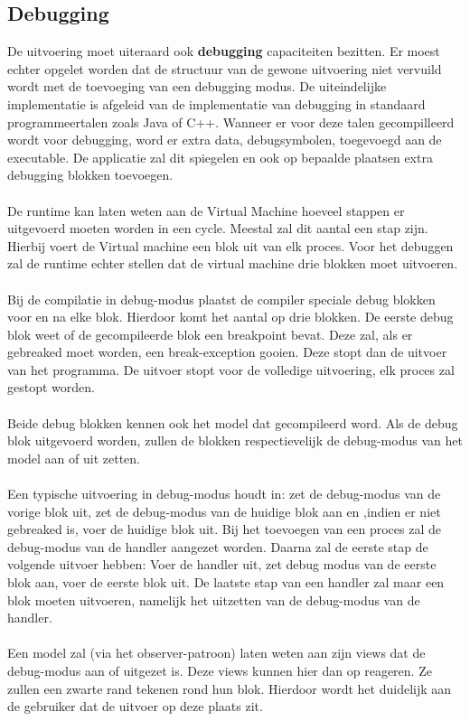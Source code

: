 \documentclass[]{article}
\begin{document}
\subsection{Debugging}
\label{debugging}
De uitvoering moet uiteraard ook \textbf{debugging} capaciteiten bezitten. Er moest echter opgelet worden dat de structuur van de gewone uitvoering niet vervuild wordt met de toevoeging van een debugging modus. De uiteindelijke implementatie is afgeleid van de implementatie van debugging in standaard programmeertalen zoals Java of C++. Wanneer er voor deze talen gecompilleerd wordt voor debugging, word er extra data, debugsymbolen, toegevoegd aan de executable. De applicatie zal dit spiegelen en ook op bepaalde plaatsen extra debugging blokken toevoegen. \\\\
De runtime kan laten weten aan de Virtual Machine hoeveel stappen er uitgevoerd moeten worden in een cycle. Meestal zal dit aantal een stap zijn. Hierbij voert de Virtual machine een blok uit van elk proces. Voor het debuggen zal de runtime echter stellen dat de virtual machine drie blokken moet uitvoeren. \\\\
Bij de compilatie in debug-modus plaatst de compiler speciale debug blokken voor en na elke blok. Hierdoor komt het aantal op drie blokken. De eerste debug blok weet of de gecompileerde blok een breakpoint bevat. Deze zal, als er gebreaked moet worden, een break-exception gooien. Deze stopt dan de uitvoer van het programma. De uitvoer stopt voor de volledige uitvoering, elk proces zal gestopt worden. \\\\
Beide debug blokken kennen ook het model dat gecompileerd word. Als de debug blok uitgevoerd worden, zullen de blokken respectievelijk de debug-modus van het model aan of uit zetten. \\\\
Een typische uitvoering in debug-modus houdt in: zet de debug-modus van de vorige blok uit, zet de debug-modus van de huidige blok aan en ,indien er niet gebreaked is, voer de huidige blok uit. Bij het toevoegen van een proces zal de debug-modus van de handler aangezet worden. Daarna zal de eerste stap de volgende uitvoer hebben: Voer de handler uit, zet debug modus van de eerste blok aan, voer de eerste blok uit. De laatste stap van een handler zal maar een blok moeten uitvoeren, namelijk het uitzetten van de debug-modus van de handler. \\\\
Een model zal (via het observer-patroon) laten weten aan zijn views dat de debug-modus aan of uitgezet is. Deze views kunnen hier dan op reageren. Ze zullen een zwarte rand tekenen rond hun blok. Hierdoor wordt het duidelijk aan de gebruiker dat de uitvoer op deze plaats zit.
\end{document}

